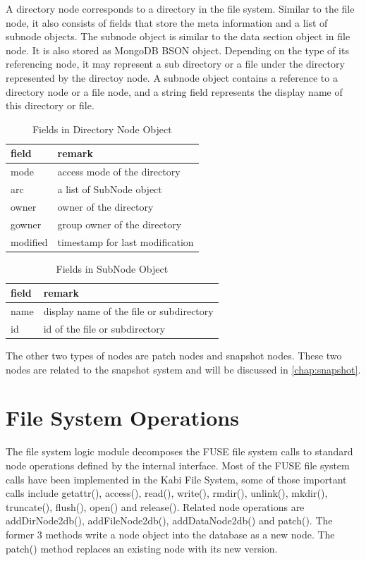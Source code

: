     A directory node corresponds to a directory in the file system. Similar to the file node, it also consists of fields that store the meta information and a list of subnode objects. The subnode object is similar to the data section object in file node. It is also stored as MongoDB BSON object. Depending on the type of its referencing node, it may represent a sub directory or a file under the directory represented by the directoy node. A subnode object contains a reference to a directory node or a file node, and a string field represents the display name of this directory or file.

\begin{table}
\caption{Fields in Directory Node Object}
\label{tab:dir_fields}
\begin{center}
\begin{tabular}{ll}
\toprule
field & remark\\
\midrule
mode & access mode of the directory\\
arc & a list of SubNode object\\
owner & owner of the directory\\
gowner & group owner of the directory\\
modified & timestamp for last modification\\
\bottomrule
\end{tabular}
\end{center}
\end{table}

\begin{table}
\caption{Fields in SubNode Object}
\label{tab:subnode_fields}
\begin{center}
\begin{tabular}{ll}
\toprule
field & remark\\
\midrule
name & display name of the file or subdirectory\\
id & id of the file or subdirectory\\
\bottomrule
\end{tabular}
\end{center}
\end{table}

    The other two types of nodes are patch nodes and snapshot nodes. These two nodes are related to the snapshot system and will be discussed in \cref{chap:snapshot}.

\section{File System Operations}
    The file system logic module decomposes the FUSE file system calls to standard node operations defined by the internal interface. Most of the FUSE file system calls have been implemented in the Kabi File System, some of those important calls include getattr(), access(), read(), write(), rmdir(), unlink(), mkdir(), truncate(), flush(), open() and release(). Related node operations are addDirNode2db(), addFileNode2db(), addDataNode2db() and patch(). The former 3 methods write a node object into the database as a new node. The patch() method replaces an existing node with its new version.

